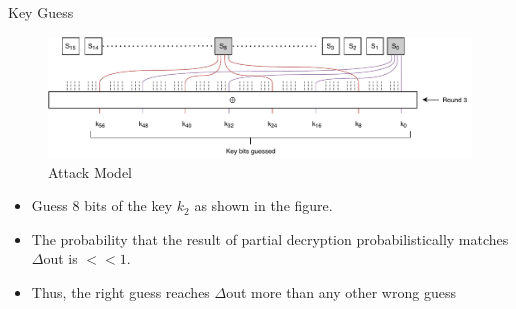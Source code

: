 \begin{frame}{Key Guess}
    \begin{figure}[H]
        \centering
        \minipage{\textwidth}
        \includegraphics[width=\linewidth]{DC2.pdf}
        \endminipage
        \caption{Attack Model}
    \end{figure}
    \begin{itemize}
        \item Guess 8 bits of the key $k_2$ as shown in the figure.
        \item The probability that the result of partial decryption probabilistically matches $\Delta$out is $<<1$.
        \item Thus, the right guess reaches $\Delta$out more than any other
wrong guess
    \end{itemize}
\end{frame}